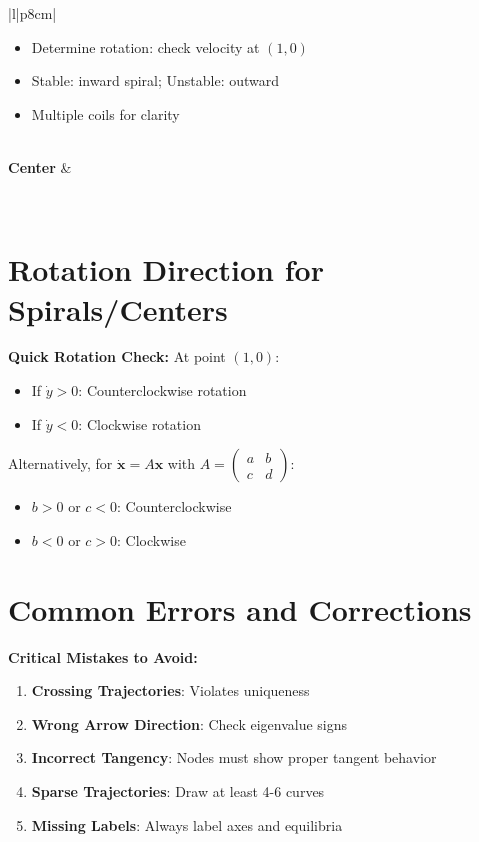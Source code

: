 \documentclass[12pt]{article}
\begin{document}
\begin{center}
\begin{tabular}{|l|p{8cm}|}
\begin{itemize}
    \item Determine rotation: check velocity at $(1,0)$
    \item Stable: inward spiral; Unstable: outward
    \item Multiple coils for clarity
\end{itemize} \\
\hline
\textbf{Center} &
 \\
\hline
\end{tabular}
\end{center}

\section{Rotation Direction for Spirals/Centers}

\begin{keypoint}
\textbf{Quick Rotation Check:}
At point $(1, 0)$:
\begin{itemize}
    \item If $\dot{y} > 0$: Counterclockwise rotation
    \item If $\dot{y} < 0$: Clockwise rotation
\end{itemize}
Alternatively, for $\dot{\mathbf{x}} = A\mathbf{x}$ with $A = \begin{pmatrix} a & b \\ c & d \end{pmatrix}$:
\begin{itemize}
    \item $b > 0$ or $c < 0$: Counterclockwise
    \item $b < 0$ or $c > 0$: Clockwise
\end{itemize}
\end{keypoint}

\section{Common Errors and Corrections}

\begin{warning}
\textbf{Critical Mistakes to Avoid:}
\begin{enumerate}
    \item \textbf{Crossing Trajectories}: Violates uniqueness
    \item \textbf{Wrong Arrow Direction}: Check eigenvalue signs
    \item \textbf{Incorrect Tangency}: Nodes must show proper tangent behavior
    \item \textbf{Sparse Trajectories}: Draw at least 4-6 curves
    \item \textbf{Missing Labels}: Always label axes and equilibria
\end{enumerate}
\end{warning}
\end{document}
